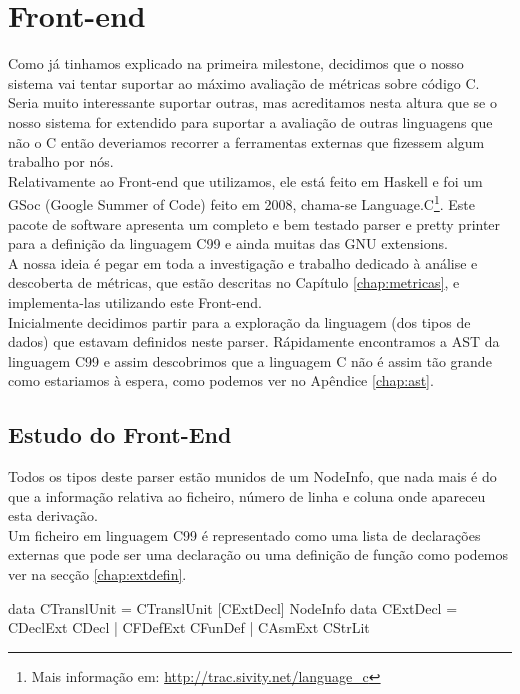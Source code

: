 \chapter{Front-end}
\minitoc
Como já tinhamos explicado na primeira milestone, decidimos que o nosso sistema vai tentar suportar ao máximo avaliação de métricas sobre código C.
Seria muito interessante suportar outras, mas acreditamos nesta altura que se o nosso sistema for extendido para suportar a avaliação de outras linguagens que não o C
então deveriamos recorrer a ferramentas externas que fizessem algum trabalho por nós.\\
Relativamente ao Front-end que utilizamos, ele está feito em Haskell e foi um GSoc (Google Summer of Code) feito em 2008, chama-se Language.C\footnote{Mais informação em: \url{http://trac.sivity.net/language\_c}}.
Este pacote de software apresenta um completo e bem testado parser e pretty printer para a definição da linguagem \textrm{C99} e ainda muitas das \textrm{GNU extensions}.\\

A nossa ideia é pegar em toda a investigação e trabalho dedicado à análise e descoberta de métricas, que estão descritas no Capítulo \ref{chap:metricas}, e implementa-las
utilizando este Front-end.\\

Inicialmente decidimos partir para a exploração da linguagem (dos tipos de dados) que estavam definidos neste parser. Rápidamente encontramos a AST da linguagem \textrm{C99}
e assim descobrimos que a linguagem C não é assim tão grande como estariamos à espera, como podemos ver no Apêndice \ref{chap:ast}.

\section{Estudo do Front-End}
Todos os tipos deste parser estão munidos de um \textrm{NodeInfo}, que nada mais é do que a informação relativa ao ficheiro, número de linha e coluna onde apareceu
esta derivação.\\
Um ficheiro em linguagem \textrm{C99} é representado como uma lista de declarações externas que pode ser uma declaração ou uma definição de função como podemos ver
na secção \ref{chap:extdefin}.

\begin{haskell}
data CTranslUnit = CTranslUnit [CExtDecl] NodeInfo
data CExtDecl = CDeclExt CDecl
              | CFDefExt CFunDef
              | CAsmExt CStrLit
\end{haskell}

